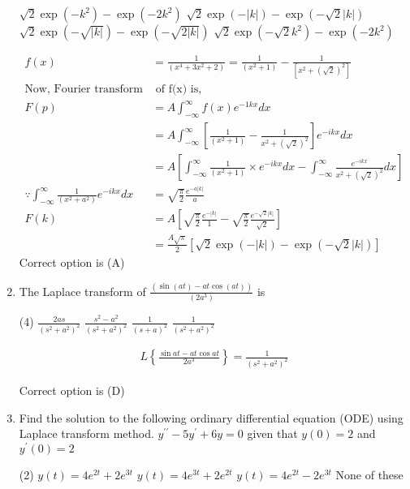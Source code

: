 \begin{enumerate}
\begin{tasks}
	\task[\textbf{a.}] $\sqrt{2} \exp \left(-k^{2}\right)-\exp \left(-2 k^{2}\right)$
	\task[\textbf{b.}]$\sqrt{2} \exp (-|k|)-\exp (-\sqrt{2}|k|)$
	\task[\textbf{c.}]$\sqrt{2} \exp (-\sqrt{|k|})-\exp (-\sqrt{2|k|})$
	\task[\textbf{d.}] $\sqrt{2} \exp \left(-\sqrt{2} k^{2}\right)-\exp \left(-2 k^{2}\right)$
\end{tasks}
\begin{answer}
	$$\begin{aligned}
	f(x)&=\frac{1}{\left(x^{4}+3 x^{2}+2\right)}=\frac{1}{\left(x^{2}+1\right)}-\frac{1}{\left[x^{2}+(\sqrt{2})^{2}\right]}\\
	\text{Now, Fourier transform}&\text{ of f(x) is,}\\
	F(p)&=A \int_{-\infty}^{\infty} f(x) e^{-1 k x} d x\\
	&=A \int_{-\infty}^{\infty}\left[\frac{1}{\left(x^{2}+1\right)}-\frac{1}{x^{2}+(\sqrt{2})^{2}}\right] e^{-i k x} d x\\&=A\left[\int_{-\infty}^{\infty} \frac{1}{\left(x^{2}+1\right)} \times e^{-i k x} d x-\int_{-\infty}^{\infty} \frac{e^{-i k x}}{x^{2}+(\sqrt{2})^{2}} d x\right]\\
	\because \int_{-\infty}^{\infty} \frac{1}{\left(x^{2}+a^{2}\right)} e^{-i k x} d x&=\sqrt{\frac{\pi}{2}} \frac{e^{-a|k|}}{a}\\
	F(k)&=A\left[\sqrt{\frac{\pi}{2}} \frac{e^{-|k|}}{1}-\sqrt{\frac{\pi}{2}} \frac{e^{-\sqrt{2}|k|}}{\sqrt{2}}\right]\\&=\frac{A \sqrt{\pi}}{2}[\sqrt{2} \exp (-|k|)-\exp (-\sqrt{2}|k|)]
	\end{aligned}$$
	Correct option is (A)
\end{answer}
\item The Laplace transform of $\frac{(\sin (a t)-a t \cos (a t))}{\left(2 a^{3}\right)}$ is
\begin{tasks}(4)
	\task[\textbf{a.}]$\frac{2 a s}{\left(s^{2}+a^{2}\right)^{2}}$
	\task[\textbf{b.}]$\frac{s^{2}-a^{2}}{\left(s^{2}+a^{2}\right)^{2}}$
	\task[\textbf{c.}] $\frac{1}{(s+a)^{2}}$
	\task[\textbf{d.}] $\frac{1}{\left(s^{2}+a^{2}\right)^{2}}$
\end{tasks}
\begin{answer}
	$$\begin{aligned}
	L\left\{\frac{\sin a t-a t \cos a t}{2 a^{3}}\right\}=\frac{1}{\left(s^{2}+a^{2}\right)^{2}}
	\end{aligned}$$
	
	Correct option is (D)
\end{answer}
\item Find the solution to the following ordinary differential equation (ODE) using Laplace transform method.
$y^{\prime \prime}-5 y^{\prime}+6 y=0$ given that $y(0)=2$ and $y^{\prime}(0)=2$
\begin{tasks}(2)
	\task[\textbf{a.}] $y(t)=4 e^{2 t}+2 e^{3 t}$
	\task[\textbf{b.}]$y(t)=4 e^{3 t}+2 e^{2 t}$
	\task[\textbf{c.}]$y(t)=4 e^{2 t}-2 e^{3 t}$
	\task[\textbf{d.}] None of these 
\end{tasks}


\end{enumerate}
